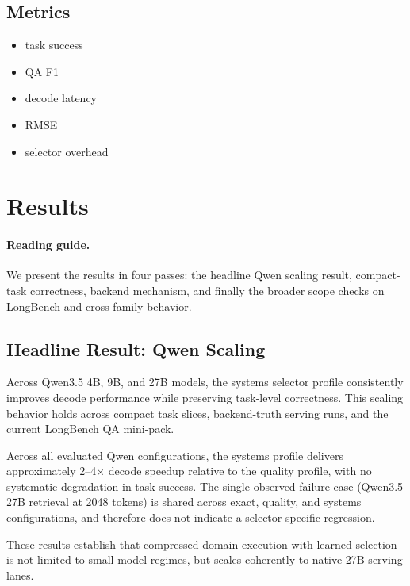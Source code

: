 \documentclass[11pt]{article}
\begin{document}
\subsection{Metrics}

\begin{itemize}[leftmargin=1.5em]
\item task success
\item QA F1
\item decode latency
\item RMSE
\item selector overhead
\end{itemize}

\FloatBarrier

\section{Results}

\paragraph{Reading guide.}
We present the results in four passes: the headline Qwen scaling result, compact-task correctness, backend mechanism, and finally the broader scope checks on LongBench and cross-family behavior.

\subsection{Headline Result: Qwen Scaling}

Across Qwen3.5 4B, 9B, and 27B models, the systems selector profile consistently improves decode performance while preserving task-level correctness. This scaling behavior holds across compact task slices, backend-truth serving runs, and the current LongBench QA mini-pack.

Across all evaluated Qwen configurations, the systems profile delivers approximately 2--4$\times$ decode speedup relative to the quality profile, with no systematic degradation in task success. The single observed failure case (Qwen3.5 27B retrieval at 2048 tokens) is shared across exact, quality, and systems configurations, and therefore does not indicate a selector-specific regression.

These results establish that compressed-domain execution with learned selection is not limited to small-model regimes, but scales coherently to native 27B serving lanes.
\end{document}
